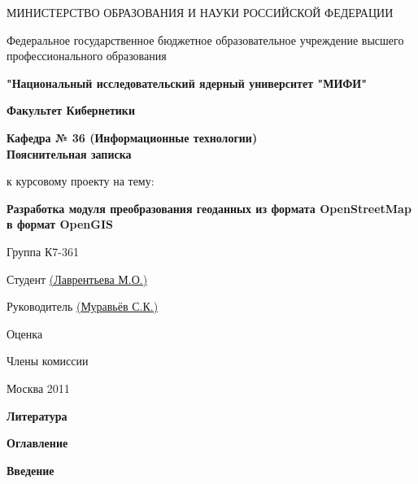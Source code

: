 \documentclass[12pt,a4paper,oneside]{article} %
\begin{document}
\onehalfspacing
\pagestyle{empty} %
\newpage
\begin{center}
{\small МИНИСТЕРСТВО ОБРАЗОВАНИЯ И НАУКИ РОССИЙСКОЙ ФЕДЕРАЦИИ

Федеральное государственное бюджетное образовательное учреждение высшего профессионального образования

\textbf{"Национальный исследовательский ядерный университет "МИФИ"}
\\[50pt]
}
\textbf{Факультет Кибернетики}

\textbf{Кафедра № 36 (Информационные технологии)
\\[50pt]
\Large{Пояснительная записка}}

к курсовому проекту на тему:

\textbf{Разработка модуля преобразования геоданных из формата OpenStreetMap в формат OpenGIS}
\\[60pt]
\end{center}
\begin{flushleft}
Группа К7-361

Студент \underline{\hspace{9,5cm} (Лаврентьева М.О.)}

Руководитель \underline{\hspace{9cm} (Муравьёв С.К.)}

Оценка \underline{\hspace{14,25cm}}

Члены комиссии \underline{\hspace{12,2cm}}

\hspace{3,7cm} \underline{\hspace{12,2cm}}

\hspace{3,7cm} \underline{\hspace{12,2cm}}

\hspace{3,7cm} \underline{\hspace{12,2cm}}

\end{flushleft}
\begin{center}
\vfill
Москва 2011
\end{center}
\newpage
\begin{center}
\textbf{Литература}
\end{center}
\newpage
\begin{center}
\textbf{Оглавление}
\end{center}
\newpage
\begin{center}
\textbf{Введение}
\end{center}
\end{document}

